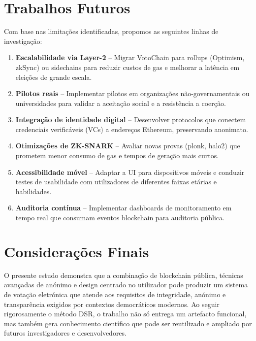 \section{Trabalhos Futuros}
Com base nas limitações identificadas, propomos as seguintes linhas de investigação:
\begin{enumerate}
    \item \textbf{Escalabilidade via Layer-2} – Migrar VotoChain para rollups (Optimism, zkSync) ou sidechains para reduzir custos de gas e melhorar a latência em eleições de grande escala.
    \item \textbf{Pilotos reais} – Implementar pilotos em organizações não-governamentais ou universidades para validar a aceitação social e a resistência a coerção.
    \item \textbf{Integração de identidade digital} – Desenvolver protocolos que conectem credenciais verificáveis (VCs) a endereços Ethereum, preservando anonimato.
    \item \textbf{Otimizações de ZK-SNARK} – Avaliar novas provas (plonk, halo2) que prometem menor consumo de gas e tempos de geração mais curtos.
    \item \textbf{Acessibilidade m{\'o}vel} – Adaptar a UI para dispositivos m{\'o}veis e conduzir testes de usabilidade com utilizadores de diferentes faixas et{\'a}rias e habilidades.
    \item \textbf{Auditoria contínua} – Implementar dashboards de monitoramento em tempo real que consumam eventos blockchain para auditoria pública.
\end{enumerate}

\section{Considerações Finais}
O presente estudo demonstra que a combina{\c{c}}{\~a}o de blockchain p{\'u}blica, t{\'e}cnicas avan{\c{c}}adas de an{\'o}nimo e design centrado no utilizador pode produzir um sistema de vota{\c{c}}{\~a}o eletr{\'o}nica que atende aos requisitos de integridade, an{\'o}nimo e transpar{\^e}ncia exigidos por contextos democr{\'a}ticos modernos. Ao seguir rigorosamente o m{\'e}todo DSR, o trabalho n{\~a}o s{\'o} entrega um artefacto funcional, mas tamb{\'e}m gera conhecimento cient{\'i}fico que pode ser reutilizado e ampliado por futuros investigadores e desenvolvedores.


